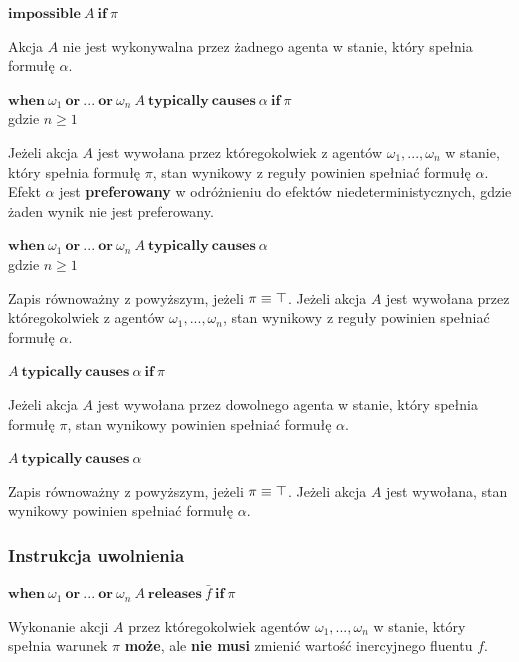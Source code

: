 \documentclass[11pt,a4paper]{article}
\def\tang{\ThisStyle{\abovebaseline[0pt]{\scalebox{-1}{$\SavedStyle\perp$}}}}
\begin{document}
    \begin{center}
        $\mathbf{impossible}~A~\mathbf{if}~\pi$
    \end{center}
    Akcja $A$ nie jest wykonywalna przez żadnego agenta w stanie, który spełnia formułę $\alpha$.
    
    \begin{center}
        $\mathbf{when}~\omega_1~\mathbf{or}~...~\mathbf{or}~\omega_n~A~\mathbf{typically~causes}~\alpha~\mathbf{if}~\pi$
        \\gdzie $n \geq 1$
    \end{center}
    Jeżeli akcja $A$ jest wywołana przez któregokolwiek z agentów $\omega_1, ..., \omega_n$ w stanie, który spełnia formułę $\pi$, stan wynikowy z reguły powinien spełniać formułę $\alpha$. Efekt $\alpha$ jest \textbf{preferowany} w odróżnieniu do efektów niedeterministycznych, gdzie żaden wynik nie jest preferowany.
    
    \begin{center}
        $\mathbf{when}~\omega_1~\mathbf{or}~...~\mathbf{or}~\omega_n~A~\mathbf{typically~causes}~\alpha$
        \\gdzie $n \geq 1$
    \end{center}
    Zapis równoważny z powyższym, jeżeli $\pi \equiv \tang$. Jeżeli akcja $A$ jest wywołana przez któregokolwiek z agentów $\omega_1, ..., \omega_n$, stan wynikowy z reguły powinien spełniać formułę $\alpha$.
    
    \begin{center}
        $A~\mathbf{typically~causes}~\alpha~\mathbf{if}~\pi$    
    \end{center}
    Jeżeli akcja $A$ jest wywołana przez dowolnego agenta w stanie, który spełnia formułę $\pi$, stan wynikowy powinien spełniać formułę $\alpha$.
    
    \begin{center}
        $A~\mathbf{typically~causes}~\alpha$
    \end{center}
    Zapis równoważny z powyższym, jeżeli $\pi \equiv \tang$. Jeżeli akcja $A$ jest wywołana, stan wynikowy powinien spełniać formułę $\alpha$.
    
    \subsubsection{Instrukcja uwolnienia}
    
    \begin{center}
        $\mathbf{when}~\omega_1~\mathbf{or}~...~\mathbf{or}~\omega_n~A~\mathbf{releases}~\bar{f}~\mathbf{if}~\pi$
    \end{center}
    Wykonanie akcji $A$ przez któregokolwiek agentów $\omega_1, ..., \omega_n$ w stanie, który spełnia warunek $\pi$ \textbf{może}, ale \textbf{nie musi} zmienić wartość inercyjnego fluentu $f$.
    
\end{document}
